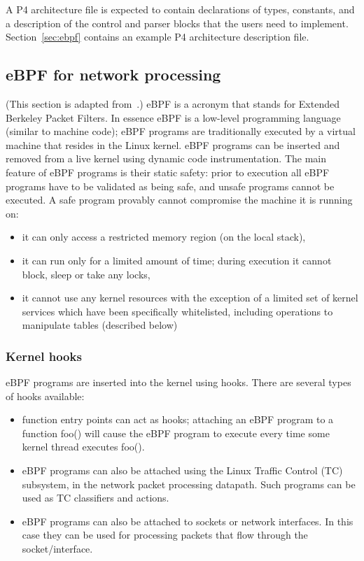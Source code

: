 A P4 architecture file is expected to contain declarations of types,
constants, and a description of the control and parser blocks that the
users need to implement.  Section~\ref{sec:ebpf} contains an example
P4 architecture description file.

\subsection{eBPF for network processing}

(This section is adapted from~\cite{p4-ebpf-backend}.)  eBPF is a
acronym that stands for Extended Berkeley Packet Filters. In essence
eBPF is a low-level programming language (similar to machine code);
eBPF programs are traditionally executed by a virtual machine that
resides in the Linux kernel. eBPF programs can be inserted and removed
from a live kernel using dynamic code instrumentation. The main
feature of eBPF programs is their static safety: prior to execution
all eBPF programs have to be validated as being safe, and unsafe
programs cannot be executed. A safe program provably cannot compromise
the machine it is running on:
\begin{itemize}
\item it can only access a restricted memory region (on the local
  stack),
\item it can run only for a limited amount of time; during execution
  it cannot block, sleep or take any locks,
\item it cannot use any kernel resources with the exception of a
  limited set of kernel services which have been specifically
  whitelisted, including operations to manipulate tables (described
  below)
\end{itemize}

\subsubsection{Kernel hooks}

eBPF programs are inserted into the kernel using hooks. There are
several types of hooks available:

\begin{itemize}
\item function entry points can act as hooks; attaching an eBPF
  program to a function foo() will cause the eBPF program to execute
  every time some kernel thread executes foo().

\item eBPF programs can also be attached using the Linux Traffic
  Control (TC) subsystem, in the network packet processing
  datapath. Such programs can be used as TC classifiers and actions.

\item eBPF programs can also be attached to sockets or network
  interfaces. In this case they can be used for processing packets
  that flow through the socket/interface.
\end{itemize}

